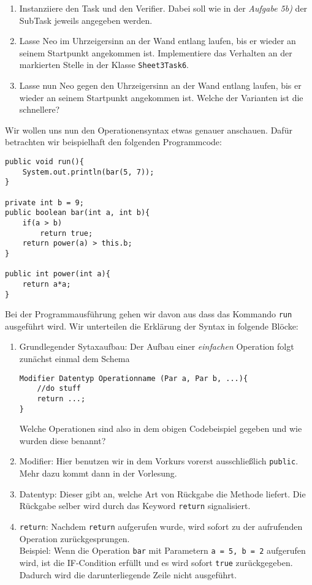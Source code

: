 
\begin{enumerate}[label=\alph*)]
    \item Instanziiere den Task und den Verifier. Dabei soll wie in der \textit{Aufgabe 5b)} der SubTask jeweils angegeben werden.
    \item Lasse Neo im Uhrzeigersinn an der Wand entlang laufen, bis er wieder an seinem Startpunkt angekommen ist.
    Implementiere das Verhalten an der markierten Stelle in der Klasse \lstinline{Sheet3Task6}.
    \item Lasse nun Neo gegen den Uhrzeigersinn an der Wand entlang laufen, bis er wieder an seinem Startpunkt angekommen ist.
    Welche der Varianten ist die schnellere?
\end{enumerate}
\begin{Infobox}[Operationensyntax]
    Wir wollen uns nun den Operationensyntax etwas genauer anschauen. Dafür betrachten wir beispielhaft den folgenden Programmcode:
    \begin{lstlisting}[breaklines=true, numbers=none]
public void run(){
    System.out.println(bar(5, 7));
}

private int b = 9;
public boolean bar(int a, int b){
    if(a > b)
        return true;
    return power(a) > this.b;
}

public int power(int a){
    return a*a;
}
\end{lstlisting}
Bei der Programmausführung gehen wir davon aus dass das Kommando \lstinline{run} ausgeführt wird. Wir unterteilen die Erklärung der Syntax in folgende Blöcke:
\begin{enumerate}[label=\roman*)]
    \item 
    Grundlegender Sytaxaufbau: Der Aufbau einer \textit{einfachen} Operation folgt zunächst einmal dem Schema 
    \begin{lstlisting}
Modifier Datentyp Operationname (Par a, Par b, ...){
    //do stuff
    return ...;
}
    \end{lstlisting}
    Welche Operationen sind also in dem obigen Codebeispiel gegeben und wie wurden diese benannt?
    \item Modifier: Hier benutzen wir in dem Vorkurs vorerst ausschließlich \lstinline{public}. Mehr dazu kommt dann in der Vorlesung.
    \item Datentyp: Dieser gibt an, welche Art von Rückgabe die Methode liefert. Die Rückgabe selber wird durch das Keyword \lstinline{return} signalisiert.
    \item \lstinline{return}:
    Nachdem \lstinline{return} aufgerufen wurde, wird sofort zu der aufrufenden Operation zurückgesprungen.\\
    Beispiel: Wenn die Operation \lstinline{bar} mit Parametern \lstinline{a = 5, b = 2} aufgerufen wird, ist die IF-Condition erfüllt und es wird sofort \lstinline{true} zurückgegeben.
    Dadurch wird die darunterliegende Zeile nicht ausgeführt.
\end{enumerate}

\end{Infobox}
